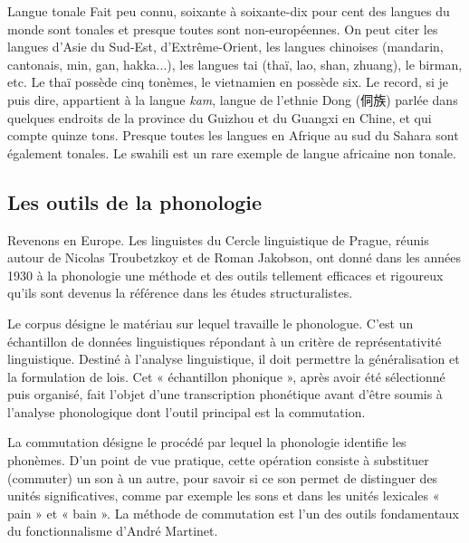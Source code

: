 \begin{bbcomplement}{Langue tonale}
Fait peu connu, soixante à soixante-dix pour cent des langues du monde sont tonales et presque toutes sont non-européennes. On peut citer les langues d’Asie du Sud-Est, d’Extrême-Orient, les langues chinoises (mandarin, cantonais, min, gan, hakka...), les langues tai (thaï, lao, shan, zhuang), le birman, etc. Le thaï possède cinq tonèmes, le vietnamien en possède six. Le record, si je puis dire, appartient à la langue \textit{kam}, langue de l’ethnie Dong (侗族) parlée dans quelques endroits de la province du Guizhou et du Guangxi en Chine, et qui compte quinze tons. Presque toutes les langues en Afrique au sud du Sahara sont également tonales. Le swahili est un rare exemple de langue africaine non tonale.
\end{bbcomplement}

\subsection{Les outils de la phonologie}
Revenons en Europe. Les linguistes du Cercle linguistique de Prague, réunis autour de Nicolas Troubetzkoy et de Roman Jakobson, ont donné dans les années 1930 à la phonologie une méthode et des outils tellement efficaces et rigoureux qu’ils sont devenus la référence dans les études structuralistes.

Le corpus désigne le matériau sur lequel travaille le phonologue. C’est un échantillon de données linguistiques répondant à un critère de représentativité linguistique. Destiné à l’analyse linguistique, il doit permettre la généralisation et la formulation de lois. Cet « échantillon phonique », après avoir été sélectionné puis organisé, fait l’objet d’une transcription phonétique avant d’être soumis à l’analyse phonologique dont l’outil principal est la commutation.

La commutation désigne le procédé par lequel la phonologie identifie les phonèmes. D’un point de vue pratique, cette opération consiste à substituer (commuter) un son à un autre, pour savoir si ce son permet de distinguer des unités significatives, comme par exemple les sons  et  dans les unités lexicales « pain » et « bain ». La méthode de commutation est l’un des outils fondamentaux du fonctionnalisme d’André Martinet.


